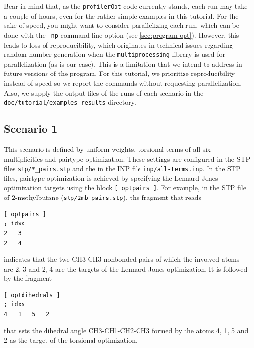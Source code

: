\documentclass[10pt,a4paper,openany]{memoir}
\numberwithin{equation}{section}
\newcommand{\under}{\_}
\newcommand{\profileropt}[0]{\texttt{profilerOpt}}
\begin{document}
Bear in mind that, as the \profileropt{} code currently stands, each
run may take a couple of hours, even for the rather simple examples in
this tutorial.
%
For the sake of speed, you might want to consider parallelizing each
run, which can be done with the \texttt{-np} command-line option (see
\autoref{sec:program-opt}).
%
However, this leads to loss of reproducibility, which originates in
technical issues regarding random number generation when the
\texttt{multiprocessing} library is used for parallelization (as is
our case).
%
This is a limitation that we intend to address in future versions of
the program.
%
For this tutorial, we prioritize reproducibility instead of speed so
we report the commands without requesting parallelization.
%
Also, we supply the output files of the runs of each scenario in the
\texttt{doc/tutorial/examples\_results} directory.

\subsection{Scenario 1}
\label{sec:tutorial-scenario-1}

This scenario is defined by uniform weights, torsional terms of all
six multiplicities and pairtype optimization.
%
These settings are configured in the STP files
\texttt{stp/*\under{}pairs.stp} and the in the INP file
\texttt{inp/all-terms.inp}.
%
In the STP files, pairtype optimization is achieved by specifying the
Lennard-Jones optimization targets using the block
\texttt{[~optpairs~]}.
%
%
For example, in the STP file of 2-methylbutane
(\texttt{stp/2mb\under{}pairs.stp}), the fragment that reads

\begin{lstlisting}[language=gromacs]
[ optpairs ]
; idxs
2   3
2   4
\end{lstlisting}\vspace{1ex}\par

\noindent indicates that the two CH3-CH3 nonbonded pairs of which the
involved atoms are 2, 3 and 2, 4 are the targets of the Lennard-Jones
optimization. It is followed by the fragment
%

\begin{lstlisting}[language=gromacs]
[ optdihedrals ]
; idxs
4   1   5   2   
\end{lstlisting}\vspace{1ex}\par

\noindent that sets the dihedral angle CH3-CH1-CH2-CH3 formed by the
atoms 4, 1, 5 and 2 as the target of the torsional optimization.
\end{document}
